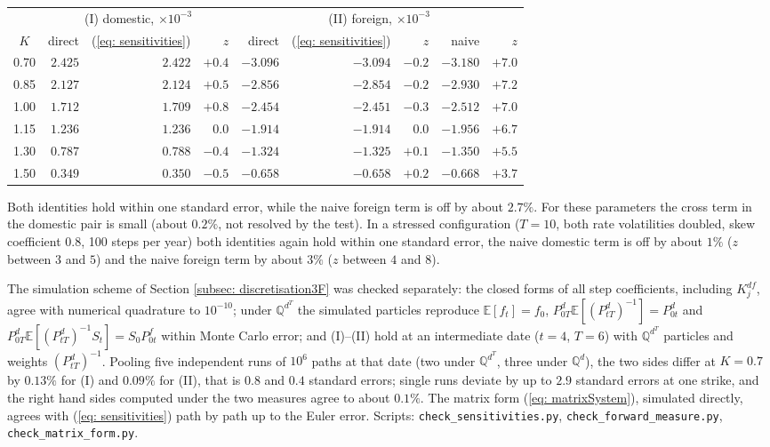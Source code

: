 \begin{center}
\begin{tabular}{c|rrr|rrr|rr}
\toprule
 & \multicolumn{3}{c|}{(I) domestic, $\times10^{-3}$} & \multicolumn{5}{c}{(II) foreign, $\times10^{-3}$}\\
$K$ & direct & (\ref{eq: sensitivities}) & $z$ & direct & (\ref{eq: sensitivities}) & $z$ & naive & $z$\\
\midrule
0.70 & $2.425$ & $2.422$ & $+0.4$ & $-3.096$ & $-3.094$ & $-0.2$ & $-3.180$ & $+7.0$\\
0.85 & $2.127$ & $2.124$ & $+0.5$ & $-2.856$ & $-2.854$ & $-0.2$ & $-2.930$ & $+7.2$\\
1.00 & $1.712$ & $1.709$ & $+0.8$ & $-2.454$ & $-2.451$ & $-0.3$ & $-2.512$ & $+7.0$\\
1.15 & $1.236$ & $1.236$ & $0.0$ & $-1.914$ & $-1.914$ & $0.0$ & $-1.956$ & $+6.7$\\
1.30 & $0.787$ & $0.788$ & $-0.4$ & $-1.324$ & $-1.325$ & $+0.1$ & $-1.350$ & $+5.5$\\
1.50 & $0.349$ & $0.350$ & $-0.5$ & $-0.658$ & $-0.658$ & $+0.2$ & $-0.668$ & $+3.7$\\
\bottomrule
\end{tabular}
\end{center}

\noindent Both identities hold within one standard error, while the naive foreign term is off by about $2.7\%$. For these parameters the cross term in the domestic pair is small (about $0.2\%$, not resolved by the test). In a stressed configuration ($T=10$, both rate volatilities doubled, skew coefficient $0.8$, 100 steps per year) both identities again hold within one standard error, the naive domestic term is off by about $1\%$ ($z$ between $3$ and $5$) and the naive foreign term by about $3\%$ ($z$ between $4$ and $8$).

The simulation scheme of Section \ref{subsec: discretisation3F} was checked separately: the closed forms of all step coefficients, including $K^{df}_j$, agree with numerical quadrature to $10^{-10}$; under $\mathbb{Q}^{d^T}$ the simulated particles reproduce $\mathbb{E}[f_t]=f_0$, $P^d_{0T}\mathbb{E}[(P^d_{tT})^{-1}]=P^d_{0t}$ and $P^d_{0T}\mathbb{E}[(P^d_{tT})^{-1}S_t]=S_0P^f_{0t}$ within Monte Carlo error; and (I)--(II) hold at an intermediate date ($t=4$, $T=6$) with $\mathbb{Q}^{d^T}$ particles and weights $(P^d_{tT})^{-1}$. Pooling five independent runs of $10^6$ paths at that date (two under $\mathbb{Q}^{d^T}$, three under $\mathbb{Q}^d$), the two sides differ at $K=0.7$ by $0.13\%$ for (I) and $0.09\%$ for (II), that is $0.8$ and $0.4$ standard errors; single runs deviate by up to $2.9$ standard errors at one strike, and the right hand sides computed under the two measures agree to about $0.1\%$.
The matrix form (\ref{eq: matrixSystem}), simulated directly, agrees with (\ref{eq: sensitivities}) path by path up to the Euler error. Scripts: \texttt{check\_sensitivities.py}, \texttt{check\_forward\_measure.py}, \texttt{check\_matrix\_form.py}.

